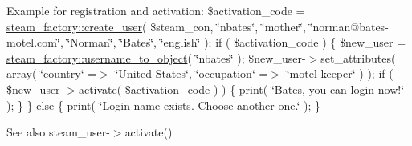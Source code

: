 Example for registration and activation: {\ttfamily  \$activation\_\-code = \hyperlink{classsteam__factory_a0ae6cf7913353af08386d25a9d063fa8}{steam\_\-factory::create\_\-user}( \$steam\_\-con, \char`\"{}nbates\char`\"{}, \char`\"{}mother\char`\"{}, \char`\"{}norman@bates-\/motel.com\char`\"{}, \char`\"{}Norman\char`\"{}, \char`\"{}Bates\char`\"{}, \char`\"{}english\char`\"{} ); if ( \$activation\_\-code ) \{ \$new\_\-user = \hyperlink{classsteam__factory_aeba4b6c2cfd86d67aec12e141a0bf971}{steam\_\-factory::username\_\-to\_\-object}( \char`\"{}nbates\char`\"{} ); \$new\_\-user-\/$>$set\_\-attributes( array( \char`\"{}country\char`\"{} =$>$ \char`\"{}United States\char`\"{}, \char`\"{}occupation\char`\"{} =$>$ \char`\"{}motel keeper\char`\"{} ) ); if ( \$new\_\-user-\/$>$activate( \$activation\_\-code ) ) \{ print( \char`\"{}Bates, you can login now!\char`\"{} ); \} \} else \{ print( \char`\"{}Login name exists. Choose another one.\char`\"{} ); \} }

\begin{DoxySeeAlso}{See also}
steam\_\-user-\/$>$activate() 
\end{DoxySeeAlso}

